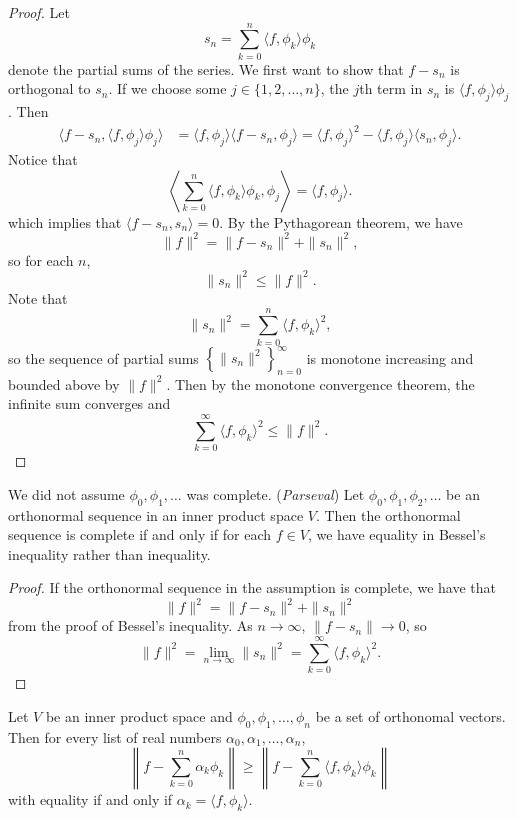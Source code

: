 \documentclass[11pt]{article}
\theoremstyle{definition}
\begin{document}
\begin{proof}
    Let 
    $$
    s_n=\sum_{k=0}^n \langle f,\phi_k\rangle \phi_k
    $$
    denote the partial sums of the series. We first want to show that $f-s_n$ is orthogonal to $s_n$. If we choose some $j\in\{1,2,\dots, n\}$, the $j$th term in $s_n$ is $\langle f,\phi_j\rangle \phi_j$. Then 
    $$
    \begin{aligned}
    \langle f-s_n,\langle f,\phi_j\rangle \phi_j\rangle&=\langle f,\phi_j\rangle\langle f-s_n,\phi_j\rangle =\langle f,\phi_j\rangle^2  -\langle f,\phi_j\rangle\langle s_n, \phi_j\rangle.
    \end{aligned}
    $$
    Notice that
    $$
    \left\langle \sum_{k=0}^n \langle f,\phi_k\rangle \phi_k,\phi_j \right\rangle=\langle f,\phi_j\rangle.
    $$
    which implies that $\langle f-s_n, s_n\rangle =0$.
    By the Pythagorean theorem, we have 
    $$
    \|f\|^2=\|f-s_n\|^2+\|s_n\|^2,
    $$
    so for each $n$,
    $$
    \|s_n\|^2\leq \|f\|^2.
    $$
    Note that
    $$
    \|s_n\|^2 = \sum_{k=0}^n\langle f,\phi_k\rangle^2,
    $$
    so the sequence of partial sums $\left\{\|s_n\|^2\right\}_{n=0}^\infty$ is monotone increasing and bounded above by $\|f\|^2$. Then by the monotone convergence theorem, the infinite sum converges and
    $$
    \sum_{k=0}^\infty \langle f,\phi_k\rangle^2 \leq\|f\|^2.
    $$
\end{proof}
\note We did not assume $\phi_0,\phi_1,\dots$ was complete. 
\prop (\textit{Parseval}) Let $\phi_0,\phi_1,\phi_2,\dots$ be an orthonormal sequence in an inner product space $V$. Then the orthonormal sequence is complete if and only if for each $f\in V$, we have equality in Bessel's inequality rather than inequality.

\begin{proof}
    If the orthonormal sequence in the assumption is complete, we have that
    $$
    \|f\|^2 = \|f-s_n\|^2 +\|s_n\|^2
    $$
    from the proof of Bessel's inequality. As $n\to \infty$, $\|f-s_n\|\to 0$, so 
    $$\|f\|^2=\lim_{n\to \infty} \|s_n\|^2=\sum_{k=0}^\infty \langle f,\phi_k\rangle ^2.$$
\end{proof}

\begin{shaded}
\theorem Let $V$ be an inner product space and $\phi_0,\phi_1,\dots,\phi_n$ be a set of orthonomal vectors. Then for every list of real numbers $\alpha_0,\alpha_1,\dots,\alpha_n$,
$$
\left\| f - \sum_{k=0}^n \alpha_k\phi_k \right\|\geq \left\| f- \sum_{k=0}^n \langle f,\phi_k\rangle \phi_k\right\|
$$
with equality if and only if $\alpha_k=\langle f,\phi_k\rangle$.
\end{shaded}
\end{document}

